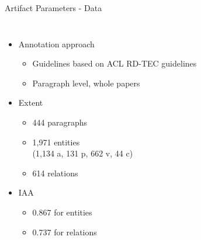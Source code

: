 \documentclass[en,16:9,smallfoot]{sdqbeamer}
\begin{document}
   \begin{frame}{Artifact Parameters - Data}
   \begin{columns}
           \begin{itemize}
               \item Annotation approach
               \begin{itemize}
                  \item Guidelines based on ACL RD-TEC guidelines~\cite{Qasemizadeh2016}
                  \item Paragraph level, whole papers
               \end{itemize}
               \item Extent
               \begin{itemize}
                  \item 444 paragraphs
                  \item 1,971 entities\\(1,134 a, 131 p, 662 v, 44 c)
                  \item 614 relations
               \end{itemize}
               \item IAA
               \begin{itemize}
                  \item 0.867 for entities
                  \item 0.737 for relations
               \end{itemize}
           \end{itemize}
\end{columns}
\end{frame}
\end{document}
